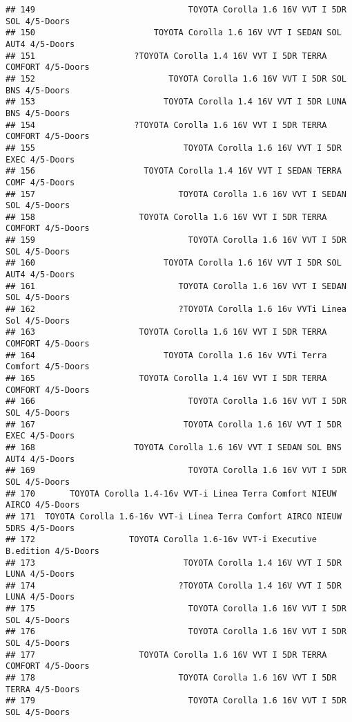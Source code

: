 \documentclass[]{article}
\begin{document}
\begin{verbatim}
## 149                               TOYOTA Corolla 1.6 16V VVT I 5DR SOL 4/5-Doors
## 150                        TOYOTA Corolla 1.6 16V VVT I SEDAN SOL AUT4 4/5-Doors
## 151                    ?TOYOTA Corolla 1.4 16V VVT I 5DR TERRA COMFORT 4/5-Doors
## 152                           TOYOTA Corolla 1.6 16V VVT I 5DR SOL BNS 4/5-Doors
## 153                          TOYOTA Corolla 1.4 16V VVT I 5DR LUNA BNS 4/5-Doors
## 154                    ?TOYOTA Corolla 1.6 16V VVT I 5DR TERRA COMFORT 4/5-Doors
## 155                              TOYOTA Corolla 1.6 16V VVT I 5DR EXEC 4/5-Doors
## 156                      TOYOTA Corolla 1.4 16V VVT I SEDAN TERRA COMF 4/5-Doors
## 157                             TOYOTA Corolla 1.6 16V VVT I SEDAN SOL 4/5-Doors
## 158                     TOYOTA Corolla 1.6 16V VVT I 5DR TERRA COMFORT 4/5-Doors
## 159                               TOYOTA Corolla 1.6 16V VVT I 5DR SOL 4/5-Doors
## 160                          TOYOTA Corolla 1.6 16V VVT I 5DR SOL AUT4 4/5-Doors
## 161                             TOYOTA Corolla 1.6 16V VVT I SEDAN SOL 4/5-Doors
## 162                             ?TOYOTA Corolla 1.6 16v VVTi Linea Sol 4/5-Doors
## 163                     TOYOTA Corolla 1.6 16V VVT I 5DR TERRA COMFORT 4/5-Doors
## 164                          TOYOTA Corolla 1.6 16v VVTi Terra Comfort 4/5-Doors
## 165                     TOYOTA Corolla 1.4 16V VVT I 5DR TERRA COMFORT 4/5-Doors
## 166                               TOYOTA Corolla 1.6 16V VVT I 5DR SOL 4/5-Doors
## 167                              TOYOTA Corolla 1.6 16V VVT I 5DR EXEC 4/5-Doors
## 168                    TOYOTA Corolla 1.6 16V VVT I SEDAN SOL BNS AUT4 4/5-Doors
## 169                               TOYOTA Corolla 1.6 16V VVT I 5DR SOL 4/5-Doors
## 170       TOYOTA Corolla 1.4-16v VVT-i Linea Terra Comfort NIEUW AIRCO 4/5-Doors
## 171  TOYOTA Corolla 1.6-16v VVT-i Linea Terra Comfort AIRCO NIEUW 5DRS 4/5-Doors
## 172                   TOYOTA Corolla 1.6-16v VVT-i Executive B.edition 4/5-Doors
## 173                              TOYOTA Corolla 1.4 16V VVT I 5DR LUNA 4/5-Doors
## 174                             ?TOYOTA Corolla 1.4 16V VVT I 5DR LUNA 4/5-Doors
## 175                               TOYOTA Corolla 1.6 16V VVT I 5DR SOL 4/5-Doors
## 176                               TOYOTA Corolla 1.6 16V VVT I 5DR SOL 4/5-Doors
## 177                     TOYOTA Corolla 1.6 16V VVT I 5DR TERRA COMFORT 4/5-Doors
## 178                             TOYOTA Corolla 1.6 16V VVT I 5DR TERRA 4/5-Doors
## 179                               TOYOTA Corolla 1.6 16V VVT I 5DR SOL 4/5-Doors

\end{verbatim}
\end{document}
